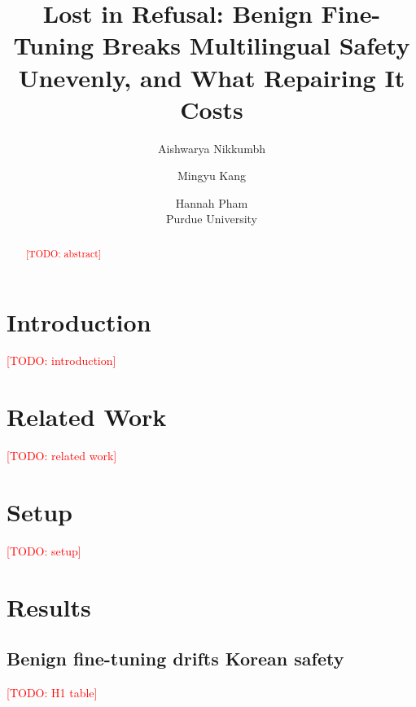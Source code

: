 \documentclass[11pt]{article}
\title{Lost in Refusal: Benign Fine-Tuning Breaks Multilingual Safety Unevenly, and What Repairing It Costs}
\author{Aishwarya Nikkumbh \and Mingyu Kang \and Hannah Pham \\
  Purdue University \\
  \texttt{\todo{emails}}}
\newcommand{\todo}[1]{\textcolor{red}{[TODO: #1]}}
\begin{document}
\maketitle

\begin{abstract}
\todo{abstract}
\end{abstract}

\section{Introduction}
\todo{introduction}

\section{Related Work}
\todo{related work}

\section{Setup}
\todo{setup}

\section{Results}
\subsection{Benign fine-tuning drifts Korean safety}
\todo{H1 table}
\end{document}
